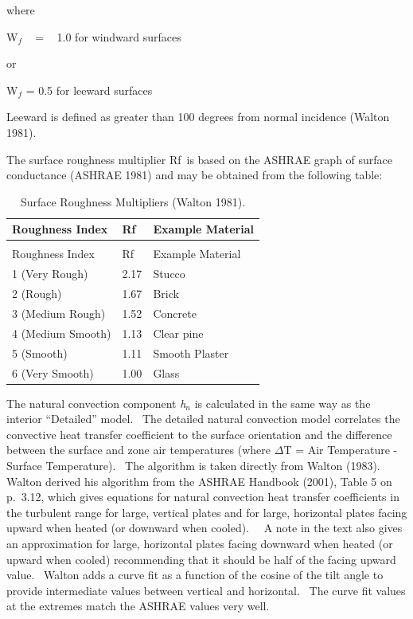 where

W\(_{f}\) ~ = ~ 1.0 for windward surfaces

or

W\(_{f}\) = 0.5 for leeward surfaces

Leeward is defined as greater than 100 degrees from normal incidence (Walton 1981).

The surface roughness multiplier Rf~is based on the ASHRAE graph of surface conductance (ASHRAE 1981) and may be obtained from the following table:

\begin{longtable}[c]{@{}lll@{}}
\caption{Surface Roughness Multipliers (Walton 1981). \label{table:surface-roughness-multipliers-walton-1981.}} \tabularnewline
\toprule 
Roughness Index & Rf & Example Material \tabularnewline
\midrule
\endfirsthead

\caption[]{Surface Roughness Multipliers (Walton 1981).} \tabularnewline
\toprule 
Roughness Index & Rf & Example Material \tabularnewline
\midrule
\endhead

1 (Very Rough) & 2.17 & Stucco \tabularnewline
2 (Rough) & 1.67 & Brick \tabularnewline
3 (Medium Rough) & 1.52 & Concrete \tabularnewline
4 (Medium Smooth) & 1.13 & Clear pine \tabularnewline
5 (Smooth) & 1.11 & Smooth Plaster \tabularnewline
6 (Very Smooth) & 1.00 & Glass \tabularnewline
\bottomrule
\end{longtable}

The natural convection component \emph{h\(_{n}\)} is calculated in the same way as the interior ``Detailed'' model.~ The detailed natural convection model correlates the convective heat transfer coefficient to the surface orientation and the difference between the surface and zone air temperatures (where $\Delta$T = Air Temperature - Surface Temperature).~ The algorithm is taken directly from Walton (1983).~ Walton derived his algorithm from the ASHRAE Handbook (2001), Table 5 on p.~3.12, which gives equations for natural convection heat transfer coefficients in the turbulent range for large, vertical plates and for large, horizontal plates facing upward when heated (or downward when cooled).~~ A note in the text also gives an approximation for large, horizontal plates facing downward when heated (or upward when cooled) recommending that it should be half of the facing upward value.~ Walton adds a curve fit as a function of the cosine of the tilt angle to provide intermediate values between vertical and horizontal.~ The curve fit values at the extremes match the ASHRAE values very well.

